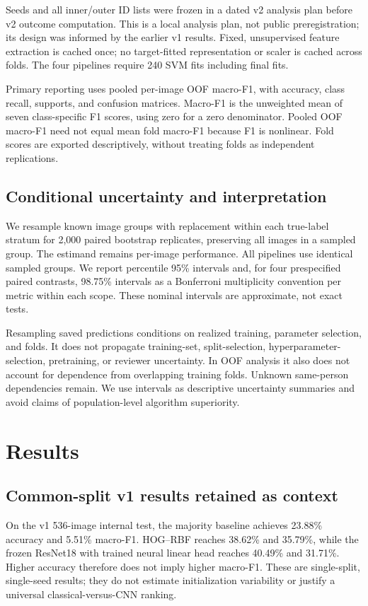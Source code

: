 \documentclass[11pt,a4paper]{article}
\begin{document}
Seeds and all inner/outer ID lists were frozen in a dated v2 analysis plan before
v2 outcome computation. This is a local analysis plan, not public preregistration;
its design was informed by the earlier v1 results. Fixed, unsupervised feature
extraction is cached once; no target-fitted representation or scaler is cached
across folds. The four pipelines require 240 SVM fits including final fits.

Primary reporting uses pooled per-image OOF macro-F1, with accuracy, class recall,
supports, and confusion matrices. Macro-F1 is the unweighted mean of seven
class-specific F1 scores, using zero for a zero denominator. Pooled OOF macro-F1
need not equal mean fold macro-F1 because F1 is nonlinear. Fold scores are
exported descriptively, without treating folds as independent replications.

\subsection{Conditional uncertainty and interpretation}
We resample known image groups with replacement within each true-label stratum
for 2,000 paired bootstrap replicates, preserving all images in a sampled group.
The estimand remains per-image performance. All pipelines use identical sampled
groups. We report percentile 95\% intervals and, for four prespecified paired
contrasts, 98.75\% intervals as a Bonferroni multiplicity convention per metric
within each scope. These nominal intervals are approximate, not exact tests.

Resampling saved predictions conditions on realized training, parameter
selection, and folds. It does not propagate training-set, split-selection,
hyperparameter-selection, pretraining, or reviewer uncertainty. In OOF analysis
it also does not account for dependence from overlapping training folds.
Unknown same-person dependencies remain. We use intervals as descriptive
uncertainty summaries and avoid claims of population-level algorithm superiority.

\section{Results}
\subsection{Common-split v1 results retained as context}
On the v1 536-image internal test, the majority baseline achieves 23.88\%
accuracy and 5.51\% macro-F1. HOG--RBF reaches 38.62\% and 35.79\%, while the
frozen ResNet18 with trained neural linear head reaches 40.49\% and 31.71\%.
Higher accuracy therefore does not imply higher macro-F1. These are single-split,
single-seed results; they do not estimate initialization variability or justify
a universal classical-versus-CNN ranking.
\end{document}
